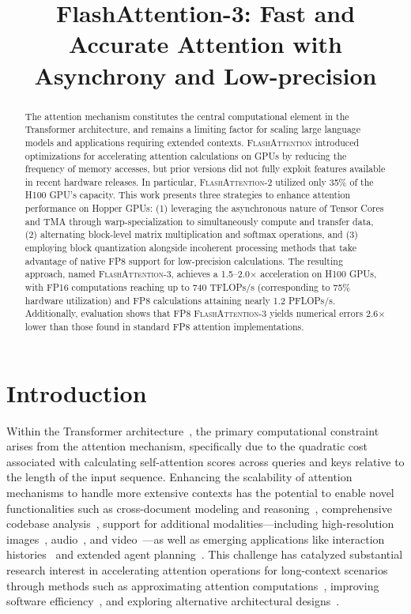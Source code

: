 \title{FlashAttention-3: Fast and Accurate Attention with Asynchrony and Low-precision}

\begin{abstract}
The attention mechanism constitutes the central computational element in the Transformer architecture, and remains a limiting factor for scaling large language models and applications requiring extended contexts. \textsc{FlashAttention} introduced optimizations for accelerating attention calculations on GPUs by reducing the frequency of memory accesses, but prior versions did not fully exploit features available in recent hardware releases. In particular, \textsc{FlashAttention-2} utilized only 35\% of the H100 GPU's capacity. This work presents three strategies to enhance attention performance on Hopper GPUs: (1) leveraging the asynchronous nature of Tensor Cores and TMA through warp-specialization to simultaneously compute and transfer data, (2) alternating block-level matrix multiplication and softmax operations, and (3) employing block quantization alongside incoherent processing methods that take advantage of native FP8 support for low-precision calculations. The resulting approach, named \textsc{FlashAttention-3}, achieves a 1.5–2.0$\times$ acceleration on H100 GPUs, with FP16 computations reaching up to 740 TFLOPs/s (corresponding to 75\% hardware utilization) and FP8 calculations attaining nearly 1.2 PFLOPs/s. Additionally, evaluation shows that FP8 \textsc{FlashAttention-3} yields numerical errors 2.6$\times$ lower than those found in standard FP8 attention implementations.
\end{abstract}

\section{Introduction}
\label{sec:intro}

Within the Transformer architecture~\citep{vaswani2017attention}, the primary computational constraint arises from the attention mechanism, specifically due to the quadratic cost associated with calculating self-attention scores across queries and keys relative to the length of the input sequence. Enhancing the scalability of attention mechanisms to handle more extensive contexts has the potential to enable novel functionalities such as cross-document modeling and reasoning~\citep{guo2021longt5,shaham2022scrolls,peng2023yarn}, comprehensive codebase analysis~\citep{roziere2023code, li2023starcoder}, support for additional modalities—including high-resolution images~\citep{chen2022scaling}, audio~\citep{gulati2020conformer}, and video~\citep{ho2022video}—as well as emerging applications like interaction histories~\citep{sun2019bert4rec} and extended agent planning~\citep{yao2022react}. This challenge has catalyzed substantial research interest in accelerating attention operations for long-context scenarios through methods such as approximating attention computations~\citep{katharopoulos2020transformers,choromanski2020rethinking, tay2020efficient}, improving software efficiency~\citep{rabe2021self,dao2022flashattention,kwon2023efficient}, and exploring alternative architectural designs~\citep{peng2023rwkv,sun2023retentive,gu2023mamba}.

